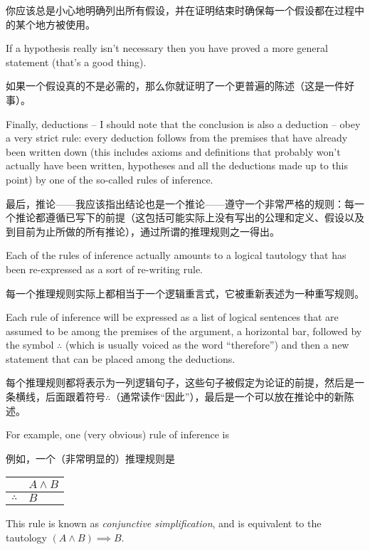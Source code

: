 你应该总是小心地明确列出所有假设，并在证明结束时确保每一个假设都在过程中的某个地方被使用。

If a hypothesis really isn't necessary then you have
proved a more general statement (that's a good thing).

如果一个假设真的不是必需的，那么你就证明了一个更普遍的陈述（这是一件好事）。

Finally, deductions -- I should note that the conclusion is also a 
deduction -- obey a very strict rule: every deduction follows from
the premises that have already been written down (this includes
axioms and definitions that probably won't actually have been written,
hypotheses and all the deductions made up to this point) by one of the 
so-called rules of inference.

最后，推论——我应该指出结论也是一个推论——遵守一个非常严格的规则：每一个推论都遵循已写下的前提（这包括可能实际上没有写出的公理和定义、假设以及到目前为止所做的所有推论），通过所谓的推理规则之一得出。

Each of the rules of inference actually amounts to a logical tautology
that has been re-expressed as a sort of re-writing rule.

每一个推理规则实际上都相当于一个逻辑重言式，它被重新表述为一种重写规则。

Each rule
of inference will be expressed as a list of logical 
sentences that are assumed to be among the premises of the argument, 
a horizontal bar, followed by the symbol $\therefore$ (which is
usually voiced as the word ``therefore'') and then a new statement 
that can be placed among the deductions.

每个推理规则都将表示为一列逻辑句子，这些句子被假定为论证的前提，然后是一条横线，后面跟着符号$\therefore$（通常读作“因此”），最后是一个可以放在推论中的新陈述。

For example, one (very obvious) rule of inference is

例如，一个（非常明显的）推理规则是

\begin{center}
\begin{tabular}{cl}
 & $A \land B$ \\ \hline
$\therefore$ & $B$\\
\end{tabular}
\end{center}
  
\noindent This rule is known as 
\emph{conjunctive simplification}, and
is equivalent to the tautology $(A \land B) \implies B$.

